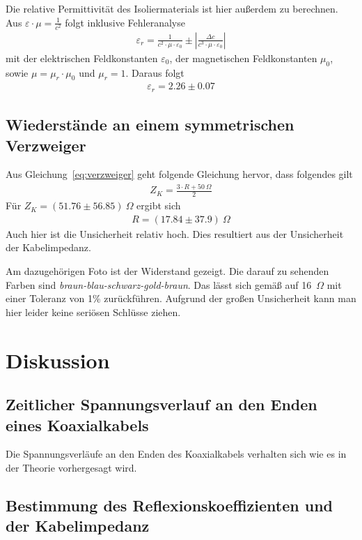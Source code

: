 \documentclass{article}
\begin{document}
Die relative Permittivität des Isoliermaterials ist hier außerdem zu berechnen. Aus $\varepsilon \cdot \mu = \frac{1}{c^2}$ folgt inklusive Fehleranalyse
\begin{align*}
\varepsilon_r = \frac{1}{c^2\cdot \mu\cdot \varepsilon_0} \pm \left| \frac{\Delta c}{c^3\cdot \mu\cdot \varepsilon_0} \right|
\end{align*}
mit der elektrischen Feldkonstanten $\varepsilon_0$, der magnetischen Feldkonstanten $\mu_0$, sowie $\mu = \mu_r\cdot\mu_0$ und $\mu_r=1$. Daraus folgt
\begin{align*}
\varepsilon_r = 2.26 \pm 0.07
\end{align*}


\subsection{Wiederstände an einem symmetrischen Verzweiger}

Aus Gleichung~\eqref{eq:verzweiger} geht folgende Gleichung hervor, dass folgendes gilt
\begin{align*}
Z_K = \frac{3\cdot R + 50~\Omega}{2}
\end{align*}
Für $Z_K = (51.76\pm56.85)~\Omega$ ergibt sich
\begin{align*}
R = (17.84 \pm 37.9)~\Omega
\end{align*}
Auch hier ist die Unsicherheit relativ hoch. Dies resultiert aus der Unsicherheit der Kabelimpedanz.

Am dazugehörigen Foto ist der Widerstand gezeigt. Die darauf zu sehenden Farben sind \textit{braun-blau-schwarz-gold-braun}. Das lässt sich gemäß \cite{resistor} auf 16~$\Omega$ mit einer Toleranz von 1\% zurückführen. Aufgrund der großen Unsicherheit kann man hier leider keine seriösen Schlüsse ziehen.




\section{Diskussion}


\subsection{Zeitlicher Spannungsverlauf an den Enden eines Koaxialkabels}

Die Spannungsverläufe an den Enden des Koaxialkabels verhalten sich wie es in der Theorie vorhergesagt wird. 


\subsection{Bestimmung des Reflexionskoeffizienten und der Kabelimpedanz}
\end{document}
